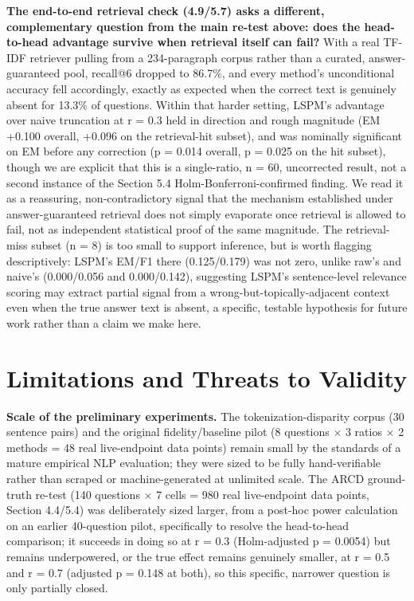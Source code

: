\textbf{The end-to-end retrieval check (4.9/5.7) asks a different, complementary question from the main re-test above: does the head-to-head advantage survive when retrieval itself can fail?} With a real TF-IDF retriever pulling from a 234-paragraph corpus rather than a curated, answer-guaranteed pool, recall@6 dropped to 86.7\%, and every method's unconditional accuracy fell accordingly, exactly as expected when the correct text is genuinely absent for 13.3\% of questions. Within that harder setting, LSPM's advantage over naive truncation at r = 0.3 held in direction and rough magnitude (EM +0.100 overall, +0.096 on the retrieval-hit subset), and was nominally significant on EM before any correction (p = 0.014 overall, p = 0.025 on the hit subset), though we are explicit that this is a single-ratio, n = 60, uncorrected result, not a second instance of the Section 5.4 Holm-Bonferroni-confirmed finding. We read it as a reassuring, non-contradictory signal that the mechanism established under answer-guaranteed retrieval does not simply evaporate once retrieval is allowed to fail, not as independent statistical proof of the same magnitude. The retrieval-miss subset (n = 8) is too small to support inference, but is worth flagging descriptively: LSPM's EM/F1 there (0.125/0.179) was not zero, unlike raw's and naive's (0.000/0.056 and 0.000/0.142), suggesting LSPM's sentence-level relevance scoring may extract partial signal from a wrong-but-topically-adjacent context even when the true answer text is absent, a specific, testable hypothesis for future work rather than a claim we make here.

\section{Limitations and Threats to Validity}
\textbf{Scale of the preliminary experiments.} The tokenization-disparity corpus (30 sentence pairs) and the original fidelity/baseline pilot (8 questions $\times$ 3 ratios $\times$ 2 methods = 48 real live-endpoint data points) remain small by the standards of a mature empirical NLP evaluation; they were sized to be fully hand-verifiable rather than scraped or machine-generated at unlimited scale. The ARCD ground-truth re-test (140 questions $\times$ 7 cells = 980 real live-endpoint data points, Section 4.4/5.4) was deliberately sized larger, from a post-hoc power calculation on an earlier 40-question pilot, specifically to resolve the head-to-head comparison; it succeeds in doing so at r = 0.3 (Holm-adjusted p = 0.0054) but remains underpowered, or the true effect remains genuinely smaller, at r = 0.5 and r = 0.7 (adjusted p = 0.148 at both), so this specific, narrower question is only partially closed.

